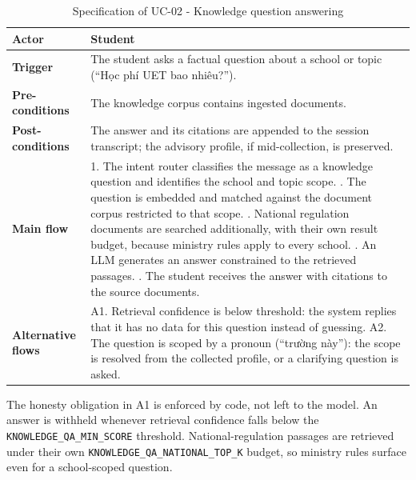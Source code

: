 \documentclass[../main.tex]{subfiles}
\begin{document}
\begin{table}[H]
    \centering
    \caption{Specification of UC-02 - Knowledge question answering}
    \label{table:uc02}
    \begin{tabular}{|p{3.2cm}|p{10.3cm}|}
        \hline
        \textbf{Actor} & Student \\
        \hline
        \textbf{Trigger} & The student asks a factual question about a school or topic (``Học phí UET bao nhiêu?''). \\
        \hline
        \textbf{Pre-conditions} & The knowledge corpus contains ingested documents. \\
        \hline
        \textbf{Post-conditions} & The answer and its citations are appended to the session transcript; the advisory profile, if mid-collection, is preserved. \\
        \hline
        \textbf{Main flow} &
        1. The intent router classifies the message as a knowledge question and identifies the school and topic scope. \newline
        2. The question is embedded and matched against the document corpus restricted to that scope. \newline
        3. National regulation documents are searched additionally, with their own result budget, because ministry rules apply to every school. \newline
        4. An \gls{LLM} generates an answer constrained to the retrieved passages. \newline
        5. The student receives the answer with citations to the source documents. \\
        \hline
        \textbf{Alternative flows} &
        A1. Retrieval confidence is below threshold: the system replies that it has no data for this question instead of guessing. \newline
        A2. The question is scoped by a pronoun (``trường này''): the scope is resolved from the collected profile, or a clarifying question is asked. \\
        \hline
    \end{tabular}
\end{table}

The honesty obligation in A1 is enforced by code, not left to the model.
An answer is withheld whenever retrieval confidence falls below the \texttt{KNOWLEDGE\_QA\_MIN\_SCORE} threshold.
National-regulation passages are retrieved under their own \texttt{KNOWLEDGE\_QA\_NATIONAL\_TOP\_K} budget, so ministry rules surface even for a school-scoped question.
\end{document}

